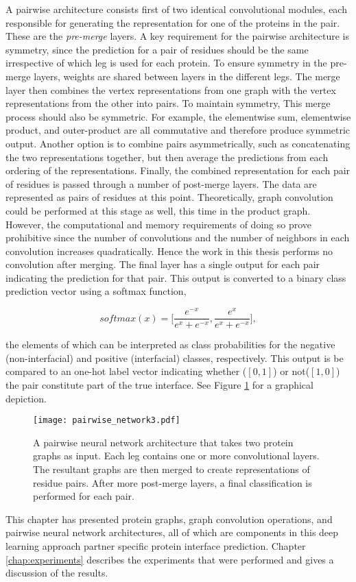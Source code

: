 A pairwise architecture consists first of two identical convolutional modules, each responsible for generating the representation for one of the proteins in the pair.
These are the \emph{pre-merge} layers.
A key requirement for the pairwise architecture is symmetry, since the prediction for a pair of residues should be the same irrespective of which leg is used for each protein.
To ensure symmetry in the pre-merge layers, weights are shared between layers in the different legs.
The merge layer then combines the vertex representations from one graph with the vertex representations from the other into pairs.
To maintain symmetry, This merge process should also be symmetric.
For example, the elementwise sum, elementwise product, and outer-product are all commutative and therefore produce symmetric output.
Another option is to combine pairs asymmetrically, such as concatenating the two representations together, but then average the predictions from each ordering of the representations.
Finally, the combined representation for each pair of residues is passed through a number of post-merge layers.
The data are represented as pairs of residues at this point. 
Theoretically, graph convolution could be performed at this stage as well, this time in the product graph.
However, the computational and memory requirements of doing so prove prohibitive since the number of convolutions and the number of neighbors in each convolution increases quadratically.
Hence the work in this thesis performs no convolution after merging.
The final layer has a single output for each pair indicating the prediction for that pair.
This output is converted to a binary class prediction vector using a softmax function, 

\begin{equation}
softmax(x) = \bigg[ \frac{e^{-x}}{e^{x} + e^{-x}} , \frac{e^{x}}{e^{x} + e^{-x}} \bigg],
\label{eq:softmax}
\end{equation}

\noindent
the elements of which can be interpreted as class probabilities for the negative (non-interfacial) and positive (interfacial) classes, respectively.
This output is be compared to an one-hot label vector indicating whether \big($[0, 1]$\big) or not\big($[1, 0]$\big) the pair constitute part of the true interface. 
See Figure \ref{fig:pairwise_arch1} for a graphical depiction.

\begin{figure}
	\texttt{[image: pairwise\_network3.pdf]}
	\caption{A pairwise neural network architecture that takes two protein graphs as input. Each leg contains one or more convolutional layers. The resultant graphs are then merged to create representations of residue pairs. After more post-merge layers, a final classification is performed for each pair.}
	\label{fig:pairwise_arch1}
\end{figure}


This chapter has presented protein graphs, graph convolution operations, and pairwise neural network architectures, all of which are components in this deep learning approach partner specific protein interface prediction.
Chapter \ref{chap:experiments} describes the experiments that were performed and gives a discussion of the results.
